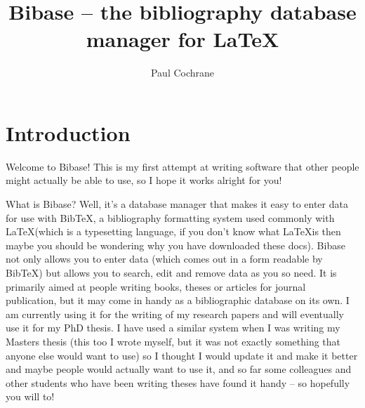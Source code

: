 \documentclass[12pt,a4paper]{book}
\begin{document}
\title{Bibase -- the bibliography database manager for \LaTeX}

\author{Paul Cochrane}

\maketitle

\frontmatter

\tableofcontents
\listoffigures

\mainmatter

\chapter{Introduction}

Welcome to Bibase!  This is my first attempt at writing software that 
other people might actually be able to use, so I hope it works alright 
for you!

What is Bibase?  Well, it's a database manager that makes it easy to 
enter data for use with BibTeX, a bibliography formatting system used 
commonly with \LaTeX (which is a typesetting language, if you don't 
know what \LaTeX is then maybe you should be wondering why you have 
downloaded these docs).  Bibase not only allows you to enter data 
(which comes out in a form readable by BibTeX) but allows you to 
search, edit and remove data as you so need.  It is primarily aimed at 
people writing books, theses or articles for journal publication, but 
it may come in handy as a bibliographic database on its own.  I am 
currently using it for the writing of my research papers and will 
eventually use it for my PhD thesis.  I have used a similar system 
when I was writing my Masters thesis (this too I wrote myself, but it 
was not exactly something that anyone else would want to use) so I 
thought I would update it and make it better and maybe people would 
actually want to use it, and so far some colleagues and other students 
who have been writing theses have found it handy -- so hopefully you 
will to!
\end{document}
